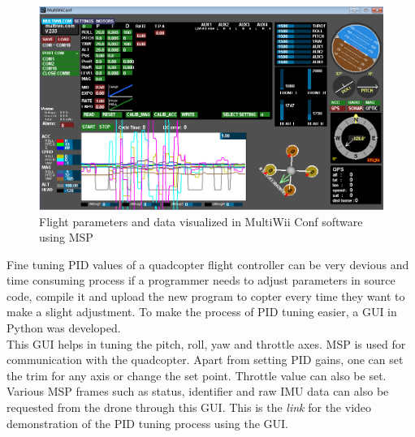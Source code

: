 \documentclass[a4paper,12pt,oneside]{book}
\begin{document}
\begin{figure}[!htb]
\centering
\includegraphics[width=\textwidth]{images/msp_conf}
\caption{Flight parameters and data visualized in MultiWii Conf software using MSP}
\label{fig:msp_conf}
\end{figure}

\bigskip

Fine tuning PID values of a quadcopter flight controller can be very devious and time consuming process if a programmer needs to adjust parameters in source code, compile it and upload the new program to copter every time they want to make a slight adjustment. To make the process of PID tuning easier, a GUI in Python was developed.\\

This GUI helps in tuning the pitch, roll, yaw and throttle axes. MSP is used for communication with the quadcopter. Apart from setting PID gains, one can set the trim for any axis or change the set point. Throttle value can also be set. Various MSP frames such as status, identifier and raw IMU data can also be requested from the drone through this GUI. This is the \textit{link} for the video demonstration of the PID tuning process using the GUI.\\ 
\end{document}
